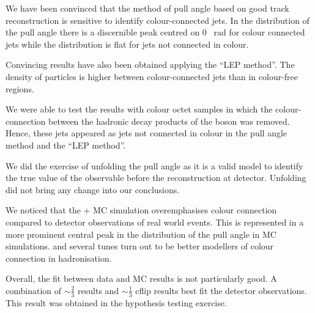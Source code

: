 We have been convinced that the method of pull angle based on good track reconstruction is sensitive to identify colour-connected jets. In the distribution of the pull angle there is a discernible peak centred on 0 ~rad for colour connected jets while the distribution is flat for jets not connected in colour.

Convincing results have also been obtained applying the ``LEP method''. The density of particles is higher between colour-connected jets than in colour-free regions.

We were able to test the results with \PW colour octet samples in which the colour-connection between the hadronic decay products of the \PW boson was removed. Hence, these jets appeared as jets not connected in colour in the pull angle method and the ``LEP method''.

We did the exercise of unfolding the pull angle as it is a valid model to identify the true value of the observable before the reconstruction at detector. Unfolding did not bring any change into our conclusions.

We noticed that the \POWHEG + \PYTHIA MC simulation overemphasises colour connection compared to detector observations of real world events. This is represented in a more prominent central peak in the distribution of the pull angle in MC simulations. \HERWIGpp and several \PYTHIA tunes turn out to be better modellers of colour connection in hadronisation.

Overall, the fit between data and MC results is not particularly good. A combination of $\sim\frac{2}{3}$ \ttbar results and $\sim\frac{1}{3}$ \ttbar cflip results best fit the detector observations. This result was obtained in the hypothesis testing exercise.
